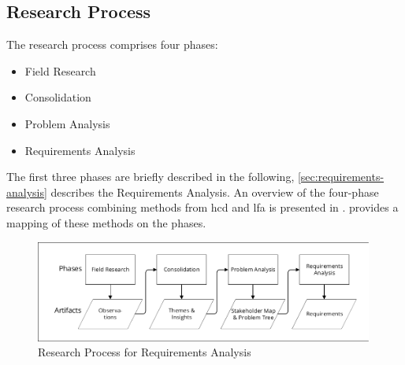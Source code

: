 \vspace{-10pt}
\hypertarget{sec:research-process}{%
\subsection{Research Process}\label{sec:research-process}}
\vspace{10pt}

The research process comprises four phases:
\begin{itemize}
\item Field Research
\item Consolidation
\item Problem Analysis
\item Requirements Analysis
\end{itemize}

The first three phases are briefly described in the following, \cref{sec:requirements-analysis} describes the Requirements Analysis.
An overview of the four-phase research process combining methods from \gls{hcd} and \gls{lfa} is presented in .  provides a mapping of these methods on the phases.

\begin{figure}
\hypertarget{fig:research-process}{%
\centering
\includegraphics[width=0.99\textwidth]{../figures/20180115-DRF-Research-Process-Flow.pdf}
\caption{Research Process for Requirements Analysis}\label{fig:research-process}
}
\end{figure}

